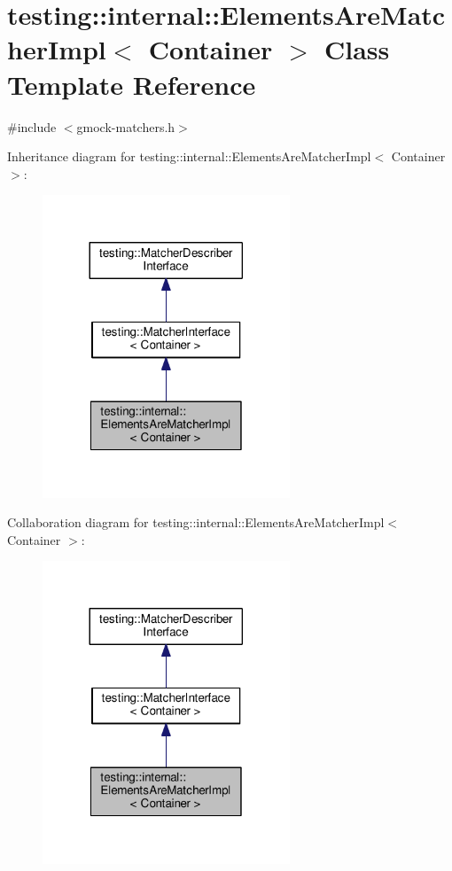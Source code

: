 \hypertarget{classtesting_1_1internal_1_1ElementsAreMatcherImpl}{}\section{testing\+:\+:internal\+:\+:Elements\+Are\+Matcher\+Impl$<$ Container $>$ Class Template Reference}
\label{classtesting_1_1internal_1_1ElementsAreMatcherImpl}


{\ttfamily \#include $<$gmock-\/matchers.\+h$>$}



Inheritance diagram for testing\+:\+:internal\+:\+:Elements\+Are\+Matcher\+Impl$<$ Container $>$\+:
\nopagebreak
\begin{figure}[H]
\begin{center}
\leavevmode
\includegraphics[width=209pt]{classtesting_1_1internal_1_1ElementsAreMatcherImpl__inherit__graph}
\end{center}
\end{figure}


Collaboration diagram for testing\+:\+:internal\+:\+:Elements\+Are\+Matcher\+Impl$<$ Container $>$\+:
\nopagebreak
\begin{figure}[H]
\begin{center}
\leavevmode
\includegraphics[width=209pt]{classtesting_1_1internal_1_1ElementsAreMatcherImpl__coll__graph}
\end{center}
\end{figure}
